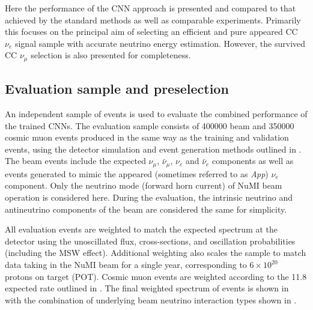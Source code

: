 Here the performance of the CNN approach is presented and compared to that achieved by the
standard \chips methods as well as comparable experiments. Primarily this focuses on the principal
aim of selecting an efficient and pure appeared CC $\nu_{e}$ signal sample with accurate neutrino
energy estimation. However, the survived CC $\nu_{\mu}$ selection is also presented for
completeness.

\subsection{Evaluation sample and preselection} %
\label{sec:results_eval_sample} %

An independent sample of events is used to evaluate the combined performance of the trained CNNs.
The evaluation sample consists of 400000 beam and 350000 cosmic muon events produced in the same
way as the training and validation events, using the detector simulation and event generation
methods outlined in . The beam events include the expected
$\nu_{\mu}$, $\bar{\nu}_{\mu}$, $\nu_{e}$ and $\bar{\nu}_{e}$ components as well as events
generated to mimic the appeared (sometimes referred to as \emph{App}) $\nu_{e}$ component. Only
the neutrino mode (forward horn current) of NuMI beam operation is considered here. During the
evaluation, the intrinsic neutrino and antineutrino components of the beam are considered the same
for simplicity.

All evaluation events are weighted to match the expected spectrum at the \chipsfive detector using
the unoscillated flux, cross-sections, and oscillation probabilities (including the MSW effect).
Additional weighting also scales the sample to match data taking in the NuMI beam for a single
year, corresponding to $6\times 10^{20}$ protons on target (POT). Cosmic muon events are weighted
according to the \SI{11.8}{} expected \chipsfive rate outlined in
. The final weighted spectrum of events is shown in
 with the combination of underlying beam neutrino interaction
types shown in .

